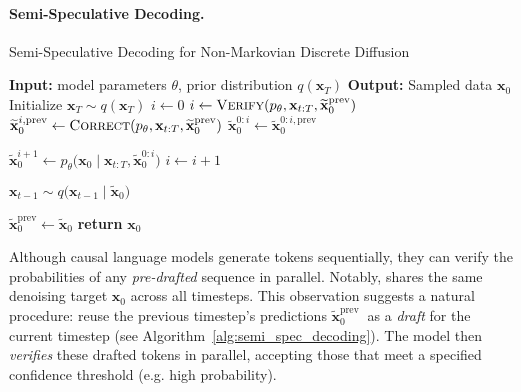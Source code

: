 \paragraph{Semi-Speculative Decoding.}

\begin{algorithm}[h]
    \caption{Semi-Speculative Decoding for Non-Markovian Discrete Diffusion}
    \label{alg:semi_spec_decoding}
    \begin{algorithmic}[1]
    \State \textbf{Input:}
        model parameters $\theta$, prior distribution $q(\mathbf{x}_T)$
    \State \textbf{Output:}
        Sampled data $\mathbf{x}_0$
    \State Initialize $\mathbf{x}_T \sim q(\mathbf{x}_T)$ 
        \State $i \gets 0$
        \State $i \gets \textsc{Verify} (p_\theta, \mathbf{x}_{t:T}, \widetilde{\mathbf{x}}_0^{\text{prev}})$ 
        \State $\widetilde{\mathbf{x}}_0^{i, \text{prev}} \gets \textsc{Correct} (p_\theta, \mathbf{x}_{t:T}, \widetilde{\mathbf{x}}_0^{\text{prev}})$
        \State $\widetilde{\mathbf{x}}_0^{0:i} \gets \widetilde{\mathbf{x}}_0^{0:i, \text{prev}}$
        \EndIf
    

            \State $\widetilde{\mathbf{x}}_0^{i+1} \gets p_\theta\bigl(\mathbf{x}_0 \mid \mathbf{x}_{t:T}, \widetilde{\mathbf{x}}_0^{0:i}\bigr)$
            \State $ i \gets i + 1$
        \EndWhile
        
        \State $\mathbf{x}_{t-1} \sim q\bigl(\mathbf{x}_{t-1} \mid \widetilde{\mathbf{x}}_0\bigr)$

        \State $\widetilde{\mathbf{x}}_0^{\text{prev}} \gets \widetilde{\mathbf{x}}_0$
    \EndFor
    \State \textbf{return} $\mathbf{x}_0$ 
    \end{algorithmic}
    \end{algorithm}

Although causal language models generate tokens sequentially, they can verify the probabilities of any \textit{pre-drafted} sequence in parallel. Notably, \method{} shares the same denoising target \(\mathbf{x}_0\) across all timesteps. This observation suggests a natural procedure: reuse the previous timestep's predictions \(\widetilde{\mathbf{x}}_0^{\text {prev }}\) as a \textit{draft} for the current timestep (see Algorithm~\ref{alg:semi_spec_decoding}). The model then \textit{verifies} these drafted tokens in parallel, accepting those that meet a specified confidence threshold (e.g. high probability).

